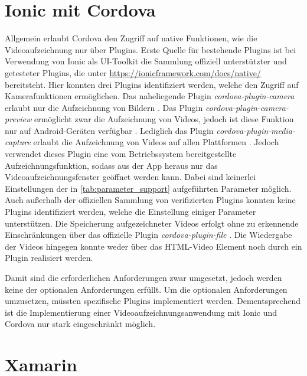 \section{Ionic mit Cordova}
\label{sec:Evaulation_Ionic}

Allgemein erlaubt Cordova den Zugriff auf native Funktionen, wie die Videoaufzeichnung nur über Plugins.
Erste Quelle für bestehende Plugins ist bei Verwendung von Ionic als UI-Toolkit die Sammlung offiziell unterstützter und getesteter Plugins, die unter \url{https://ionicframework.com/docs/native/} bereitsteht.
Hier konnten drei Plugins identifiziert werden, welche den Zugriff auf Kamerafunktionen ermöglichen.
Das naheliegende Plugin \textit{cordova-plugin-camera} erlaubt nur die Aufzeichnung von Bildern \cite{Cordova_Camera}.
Das Plugin \textit{cordova-plugin-camera-preview} ermöglicht zwar die Aufzeichnung von Videos, jedoch ist diese Funktion nur auf Android-Geräten verfügbar \cite{Cordova_CameraPreview}.
Lediglich das Plugin \textit{cordova-plugin-media-capture} erlaubt die Aufzeichnung von Videos auf allen Plattformen \cite{Cordova_MediaCapture}.
Jedoch verwendet dieses Plugin eine vom Betriebssystem bereitgestellte Aufzeichnungsfunktion, sodass aus der App heraus nur das Videoaufzeichnungsfenster geöffnet werden kann.
Dabei sind keinerlei Einstellungen der in \autoref{tab:parameter_support} aufgeführten Parameter möglich.
Auch außerhalb der offiziellen Sammlung von verifizierten Plugins konnten keine Plugins identifiziert werden, welche die Einstellung einiger Parameter unterstützen.
Die Speicherung aufgezeichneter Videos erfolgt ohne zu erkennende Einschränkungen über das offizielle Plugin \textit{cordova-plugin-file} \cite{Cordova_File}.
Die Wiedergabe der Videos hingegen konnte weder über das HTML-Video Element noch durch ein Plugin realisiert werden. 

Damit sind die erforderlichen Anforderungen zwar umgesetzt, jedoch werden keine der optionalen Anforderungen erfüllt.
Um die optionalen Anforderungen umzusetzen, müssten spezifische Plugins implementiert werden.
Dementsprechend ist die Implementierung einer Videoaufzeichnungsanwendung mit Ionic und Cordova nur stark eingeschränkt möglich.


\section{Xamarin}
\label{sec:Evaulation_Xamarin}

